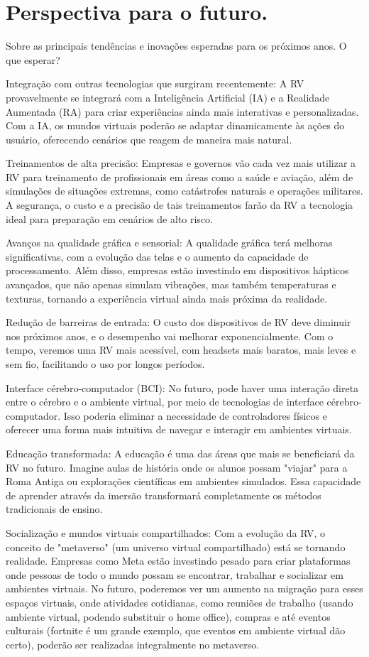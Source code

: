 \documentclass[article,a4paper,12pt,brazil,sumario=tradicional]{abntex2}
\begin{document}
\section{Perspectiva para o futuro.}
Sobre as principais tendências e inovações esperadas para os próximos anos. O que esperar?

Integração com outras tecnologias que surgiram recentemente: A RV provavelmente se integrará com a Inteligência Artificial (IA) e a Realidade Aumentada (RA) para criar experiências ainda mais interativas e personalizadas. Com a IA, os mundos virtuais poderão se adaptar dinamicamente às ações do usuário, oferecendo cenários que reagem de maneira mais natural.

Treinamentos de alta precisão: Empresas e governos vão cada vez mais utilizar a RV para treinamento de profissionais em áreas como a saúde e aviação, além de simulações de situações extremas, como catástrofes naturais e operações militares. A segurança, o custo e a precisão de tais treinamentos farão da RV a tecnologia ideal para preparação em cenários de alto risco.

Avanços na qualidade gráfica e sensorial: A qualidade gráfica terá melhoras significativas, com a evolução das telas e o aumento da capacidade de processamento. Além disso, empresas estão investindo em dispositivos hápticos avançados, que não apenas simulam vibrações, mas também temperaturas e texturas, tornando a experiência virtual ainda mais próxima da realidade. 

Redução de barreiras de entrada: O custo dos dispositivos de RV deve diminuir nos próximos anos, e o desempenho vai melhorar exponencialmente. Com o tempo, veremos uma RV mais acessível, com headsets mais baratos, mais leves e sem fio, facilitando o uso por longos períodos.

Interface cérebro-computador (BCI): No futuro, pode haver uma interação direta entre o cérebro e o ambiente virtual, por meio de tecnologias de interface cérebro-computador. Isso poderia eliminar a necessidade de controladores físicos e oferecer uma forma mais intuitiva de navegar e interagir em ambientes virtuais.

Educação transformada: A educação é uma das áreas que mais se beneficiará da RV no futuro. Imagine aulas de história onde os alunos possam "viajar" para a Roma Antiga ou explorações científicas em ambientes simulados. Essa capacidade de aprender através da imersão transformará completamente os métodos tradicionais de ensino.

Socialização e mundos virtuais compartilhados: Com a evolução da RV, o conceito de "metaverso" (um universo virtual compartilhado) está se tornando realidade. Empresas como Meta estão investindo pesado para criar plataformas onde pessoas de todo o mundo possam se encontrar, trabalhar e socializar em ambientes virtuais. No futuro, poderemos ver um aumento na migração para esses espaços virtuais, onde atividades cotidianas, como reuniões de trabalho (usando ambiente virtual, podendo substituir o home office), compras e até eventos culturais (fortnite é um grande exemplo, que eventos em ambiente virtual dão certo), poderão ser realizadas integralmente no metaverso.
\end{document}
